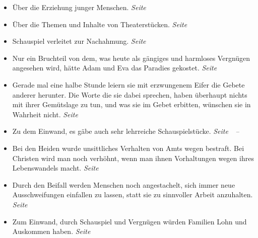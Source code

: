 \begin{itemize}
\begin{itemize}
 \item Über die Erziehung junger Menschen.
 \dotfill \textit{Seite~\pageref{ref:17_01_erziehung}}\\

 \item Über die Themen und Inhalte von Theaterstücken.
 \dotfill \textit{Seite~\pageref{ref:17_01_schauspiel}}\\

 \item Schauspiel verleitet zur Nachahmung.
 \dotfill \textit{Seite~\pageref{ref:17_01_schauspiel_2}}\\

 \item Nur ein Bruchteil von dem, was heute als gängiges und harmloses Vergnügen
angesehen wird, hätte Adam und Eva das Paradies gekostet.
 \dotfill \textit{Seite~\pageref{ref:17_02_adam_und_eva}}\\

 \item Gerade mal eine halbe Stunde leiern sie mit erzwungenem Eifer die Gebete
anderer herunter. Die Worte die sie dabei sprechen, haben überhaupt nichts mit
ihrer Gemütslage zu tun, und was sie im Gebet erbitten, wünschen sie in Wahrheit
nicht.
 \dotfill \textit{Seite~\pageref{ref:17_04_gottesdienst}}\\

 \item Zu dem Einwand, es gäbe auch sehr lehrreiche Schauspielstücke.
 \dotfill
 \textit{
 Seite~\pageref{ref:17_07_einwand}~--~\pageref{ref:17_07_einwand_ende}}\\

 \item Bei den Heiden wurde unsittliches Verhalten von Amts wegen bestraft. Bei
Christen wird man noch verhöhnt, wenn man ihnen Vorhaltungen wegen ihres
Lebenswandels macht.
 \dotfill \textit{Seite~\pageref{ref:17_08_sittenwaechter}}\\

 \item Durch den Beifall werden Menschen noch angestachelt, sich immer neue
Ausschweifungen einfallen zu lassen, statt sie zu sinnvoller Arbeit anzuhalten.
 \dotfill \textit{Seite~\pageref{ref:17_09_bedarf_wecken}}\\

 \item Zum Einwand, durch Schauspiel und Vergnügen würden Familien Lohn und
Auskommen haben.
 \dotfill \textit{Seite~\pageref{ref:17_10_einwand}}\\


\end{itemize}
\end{itemize}
